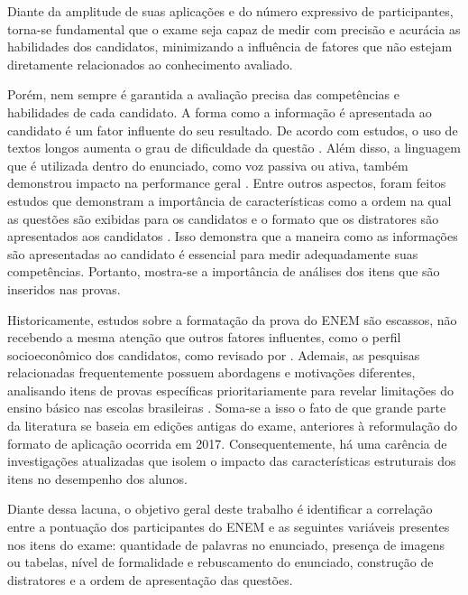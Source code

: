 \documentclass[a4paper,10pt, twocolumn]{article}
\begin{document}
Diante da amplitude de suas aplicações e do número expressivo de participantes, torna-se fundamental que o exame seja capaz de medir com precisão e acurácia as habilidades dos candidatos, minimizando a influência de fatores que não estejam diretamente relacionados ao conhecimento avaliado.

Porém, nem sempre é garantida a avaliação precisa das competências e habilidades de cada candidato. A forma como a informação é apresentada ao candidato é um fator influente do seu resultado. De acordo com estudos, o uso de textos longos aumenta o grau de dificuldade da questão \cite{Pullishery2020,2018,silva2019desempenho}. Além disso, a linguagem que é utilizada dentro do enunciado, como voz passiva ou ativa, também demonstrou impacto na performance geral \cite{correia2004complexidade,Marcom2016}. Entre outros aspectos, foram feitos estudos que demonstram a importância de características como a ordem na qual as questões são exibidas para os candidatos \cite{Barichello2022,Anaya2023} e o formato que os distratores são apresentados aos candidatos \cite{Marcom2016,lopes2015estudo,Caldwell2013}. Isso demonstra que a maneira como as informações são apresentadas ao candidato é essencial para medir adequadamente suas competências. Portanto, mostra-se a importância de análises dos itens que são inseridos nas provas. 


Historicamente, estudos sobre a formatação da prova do ENEM são escassos, não recebendo a mesma atenção que outros fatores influentes, como o perfil socioeconômico dos candidatos, como revisado por \textcite{Dutra2023}. Ademais, as pesquisas relacionadas frequentemente possuem abordagens e motivações diferentes, analisando itens de provas específicas prioritariamente para revelar limitações do ensino básico nas escolas brasileiras \cite{Cestaro2020, lopes2015estudo}. Soma-se a isso o fato de que grande parte da literatura se baseia em edições antigas do exame, anteriores à reformulação do formato de aplicação ocorrida em 2017. Consequentemente, há uma carência de investigações atualizadas que isolem o impacto das características estruturais dos itens no desempenho dos alunos.

Diante dessa lacuna, o objetivo geral deste trabalho é identificar a correlação entre a pontuação dos participantes do ENEM e as seguintes variáveis presentes nos itens do exame: quantidade de palavras no enunciado, presença de imagens ou tabelas, nível de formalidade e rebuscamento do enunciado, construção de distratores e a ordem de apresentação das questões. 
\end{document}
